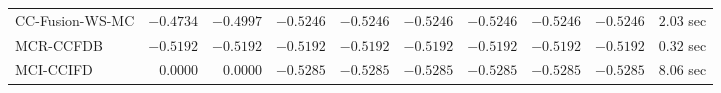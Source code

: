\begin{table}[H]
\begin{tabular}{lrrrrrrrrr}
     CC-Fusion-WS-MC & $      -0.4734$ & $      -0.4997$ & $      -0.5246$ & $      -0.5246$ & $      -0.5246$ & $      -0.5246$ & $      -0.5246$ & $      -0.5246$ & $         2.03$ sec   \\ 
\cmidrule{1-1} 
           MCR-CCFDB & $      -0.5192$ & $      -0.5192$ & $      -0.5192$ & $      -0.5192$ & $      -0.5192$ & $      -0.5192$ & $      -0.5192$ & $      -0.5192$ & $         0.32$ sec   \\ 
\cmidrule{1-1} 
           MCI-CCIFD & $       0.0000$ & $       0.0000$ & $      -0.5285$ & $      -0.5285$ & $      -0.5285$ & $      -0.5285$ & $      -0.5285$ & $      -0.5285$ & $         8.06$ sec   \\ 
\bottomrule
\end{tabular}
\end{table}

